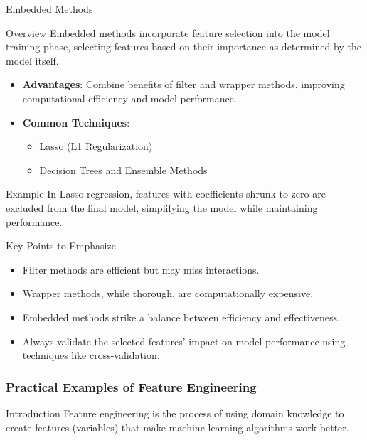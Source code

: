 \documentclass[aspectratio=169]{beamer}
\begin{document}
\begin{frame}[fragile]{Embedded Methods}
    \begin{block}{Overview}
        Embedded methods incorporate feature selection into the model training phase, selecting features based on their importance as determined by the model itself.
    \end{block}
    
    \begin{itemize}
        \item \textbf{Advantages}: Combine benefits of filter and wrapper methods, improving computational efficiency and model performance.
        \item \textbf{Common Techniques}:
        \begin{itemize}
            \item Lasso (L1 Regularization)
            \item Decision Trees and Ensemble Methods
        \end{itemize}
    \end{itemize}
    \begin{block}{Example}
        In Lasso regression, features with coefficients shrunk to zero are excluded from the final model, simplifying the model while maintaining performance.
    \end{block}
\end{frame}

\begin{frame}[fragile]{Key Points to Emphasize}
    \begin{itemize}
        \item Filter methods are efficient but may miss interactions.
        \item Wrapper methods, while thorough, are computationally expensive.
        \item Embedded methods strike a balance between efficiency and effectiveness.
        \item Always validate the selected features' impact on model performance using techniques like cross-validation.
    \end{itemize}
\end{frame}

\begin{frame}
    \frametitle{Practical Examples of Feature Engineering}
    \begin{block}{Introduction}
        Feature engineering is the process of using domain knowledge to create features (variables) that make machine learning algorithms work better.
    \end{block}
\end{frame}
\end{document}
